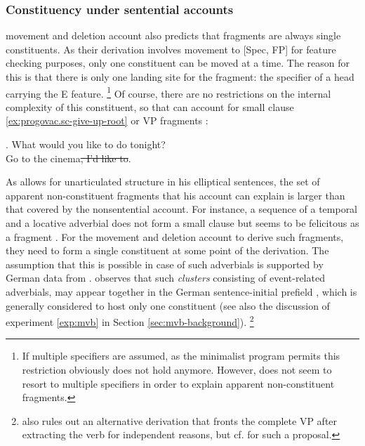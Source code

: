 \subsubsection{Constituency under sentential accounts}\largerpage
{} movement and deletion account also predicts that fragments are always single constituents. As their derivation involves movement to [Spec, FP] for feature checking purposes, only one constituent can be moved at a time. The reason for this is that there is only one landing site for the fragment: the specifier of a head carrying the E feature.%
%
\footnote{If multiple specifiers are assumed, as the minimalist program permits \citep[285]{chomsky1995} this restriction obviously does not hold anymore. However, \citet{merchant2004} does not seem to resort to multiple specifiers in order to explain apparent non-constituent fragments.}\afterfn
%
Of course, there are no restrictions on the internal complexity of this constituent, so that \citet{merchant2004} can account for small clause \ref{ex:progovac.sc-give-up-root} or VP fragments \Next:

\ex. What would you like to do tonight?\\ \label{ex:vp-fronting}
Go to the cinema\sout{, I'd like to}.

As \citet{merchant2004} allows for unarticulated structure in his elliptical sentences, the set of apparent non-constituent fragments that his account can explain is larger than that covered by the nonsentential account. For instance, a sequence of a temporal and a locative adverbial does not form a small clause but seems to be felicitous as a fragment \Next. For the movement and deletion account to derive such fragments, they need to form a single constituent at some point of the derivation. The assumption that this is possible in case of such adverbials is supported by German data from \citet{haider2000}. \citeauthor{haider2000} observes that such \textit{clusters} consisting of event-related adverbials, may appear together in the German sentence-initial prefield \NNext, which is generally considered to host only one constituent (see also the discussion of experiment \ref{exp:mvb} in Section \ref{sec:mvb-background}).%
% 
\footnote{\citet[104--105]{haider2000} also rules out an alternative derivation that fronts the complete VP after extracting the verb for independent reasons, but cf. \citet{muller2004} for such a proposal.}\afterfn%
%

